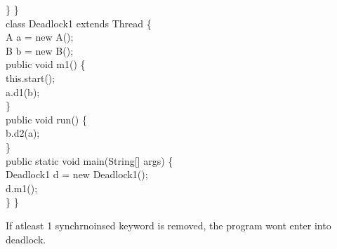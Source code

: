 \begin{flushleft}
\begin{itemize}
{			\s	\} \} \\
			class Deadlock1 extends Thread \{ \\
			\s	A a = new A(); \\
			\s 	B b = new B(); \\
			\s	public void m1() \{ \\
			\s \s		this.start(); \\
			\s \s		a.d1(b); \\
			\s	\} \\
			\s	public void run() \{ \\
			\s \s		b.d2(a); \\
			\s	\} \\
			\s	public static void main(String[] args) \{ \\
			\s \s		Deadlock1 d = new Deadlock1(); \\
			\s \s		d.m1(); \\
			\s	\} \} 		
		}		
	
		If atleast 1 synchrnoinsed keyword is removed, the program wont enter into deadlock. 
		
		
	\end{itemize}
\end{flushleft}
